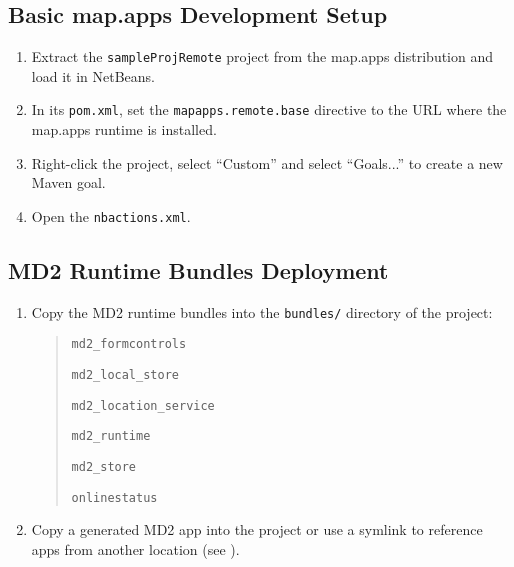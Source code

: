 
\subsection{Basic map.apps Development Setup} \label{subsec:basic-setup}

\begin{enumerate}
\item Extract the \texttt{sampleProjRemote} project from the map.apps distribution and load it in NetBeans. \label{item:extraction}
\item In its \texttt{pom.xml},
 set the \texttt{mapapps.remote.base} directive to the URL where the map.apps runtime is installed.
\item Right-click the project, select \enquote{Custom} and select \enquote{Goals...} to create a new Maven goal. 
\item Open the \texttt{nbactions.xml}. 

\end{enumerate}

\subsection{MD2 Runtime Bundles Deployment}
\begin{enumerate}
\item Copy the MD2 runtime bundles into the \texttt{bundles/} directory of the project:
	\begin{quotation}
		 \texttt{md2\_formcontrols}
		 
		 \texttt{md2\_local\_store}
		 
		 \texttt{md2\_location\_service}
		 
		 \texttt{md2\_runtime}
		 
		 \texttt{md2\_store}
		 
		 \texttt{onlinestatus}
	\end{quotation}

\item Copy a generated MD2 app into the project or use a symlink to reference apps from another location (see ).
\end{enumerate}